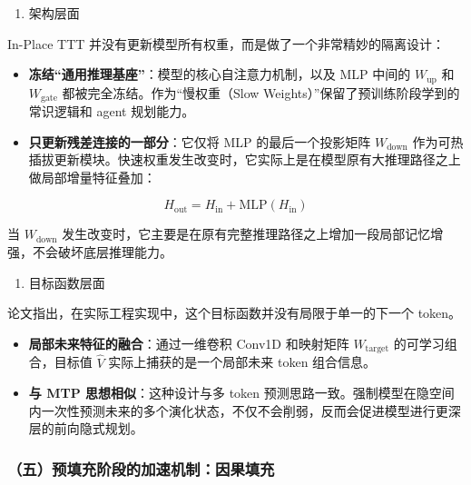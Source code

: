 \begin{enumerate}
\def\labelenumi{\arabic{enumi}.}
\tightlist
\item
  架构层面
\end{enumerate}

In-Place TTT 并没有更新模型所有权重，而是做了一个非常精妙的隔离设计：

\begin{itemize}
\tightlist
\item
  \textbf{冻结``通用推理基座''}：模型的核心自注意力机制，以及 MLP 中间的 \(W_{\mathrm{up}}\) 和 \(W_{\mathrm{gate}}\) 都被完全冻结。作为``慢权重（Slow Weights）''保留了预训练阶段学到的常识逻辑和 agent 规划能力。
\item
  \textbf{只更新残差连接的一部分}：它仅将 MLP 的最后一个投影矩阵 \(W_{\mathrm{down}}\) 作为可热插拔更新模块。快速权重发生改变时，它实际上是在模型原有大推理路径之上做局部增量特征叠加：
\end{itemize}

\[
H_{\mathrm{out}} = H_{\mathrm{in}} + \mathrm{MLP}(H_{\mathrm{in}})
\]

当 \(W_{\mathrm{down}}\) 发生改变时，它主要是在原有完整推理路径之上增加一段局部记忆增强，不会破坏底层推理能力。

\begin{enumerate}
\def\labelenumi{\arabic{enumi}.}
\setcounter{enumi}{1}
\tightlist
\item
  目标函数层面
\end{enumerate}

论文指出，在实际工程实现中，这个目标函数并没有局限于单一的下一个 token。

\begin{itemize}
\tightlist
\item
  \textbf{局部未来特征的融合}：通过一维卷积 Conv1D 和映射矩阵 \(W_{\mathrm{target}}\) 的可学习组合，目标值 \(\hat V\) 实际上捕获的是一个局部未来 token 组合信息。
\item
  \textbf{与 MTP 思想相似}：这种设计与多 token 预测思路一致。强制模型在隐空间内一次性预测未来的多个演化状态，不仅不会削弱，反而会促进模型进行更深层的前向隐式规划。
\end{itemize}

\hypertarget{ux4e94ux9884ux586bux5145ux9636ux6bb5ux7684ux52a0ux901fux673aux5236ux56e0ux679cux586bux5145}{%
\subsubsection{（五）预填充阶段的加速机制：因果填充}\label{ux4e94ux9884ux586bux5145ux9636ux6bb5ux7684ux52a0ux901fux673aux5236ux56e0ux679cux586bux5145}}

